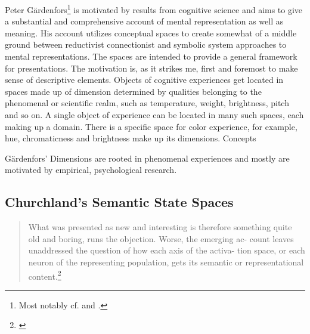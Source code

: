 \documentclass[11pt, a4paper]{scrartcl}
\begin{document}
Peter Gärdenfors\footnote{Most notably cf. \textcite{gärdenfors2004conceptual} and \textcite{Gardenfors2014-GRDTGO}.} is motivated by results from cognitive science and aims to give a substantial and comprehensive account of mental representation as well as meaning. His account utilizes conceptual spaces to create somewhat of a middle ground between reductivist connectionist and symbolic system approaches to mental representations. The spaces are intended to provide a general framework for presentations. The motivation is, as it strikes me, first and foremost to make sense of descriptive elements. Objects of cognitive experiences get located in spaces made up of dimension determined by qualities belonging to the phenomenal or scientific realm, such as temperature, weight, brightness, pitch and so on. A single object of experience can be located in many such spaces, each making up a domain. There is a specific space for color experience, for example, hue, chromaticness and brightness make up its dimensions. Concepts 

Gärdenfors' Dimensions are rooted in phenomenal experiences and mostly are motivated by empirical, psychological research.

\subsection{Churchland's Semantic State Spaces}


\begin{quote}\singlespacing{} What was presented as new and interesting is therefore something
 quite old and boring, runs the objection. Worse, the emerging ac-
 count leaves unaddressed the question of how each axis of the activa-
 tion space, or each neuron of the representing population, gets its
 semantic or representational content.\footnote{\textcite[7]{10.2307/2564566}}
 \end{quote}
\end{document}
